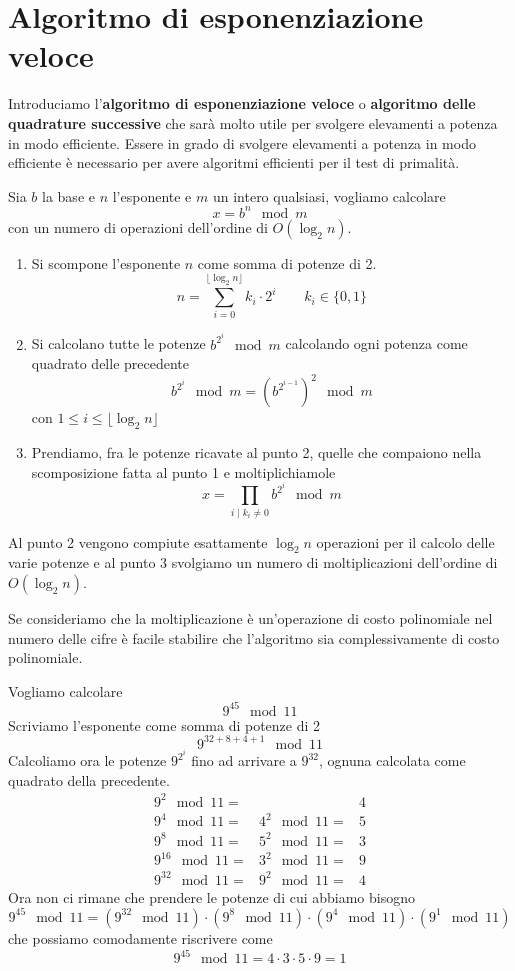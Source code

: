 \section{Algoritmo di esponenziazione veloce}\label{esponenziazione}
Introduciamo l'\textbf{algoritmo di esponenziazione veloce} o \textbf{algoritmo delle quadrature successive} che sar\`a
molto utile per svolgere elevamenti a potenza in modo efficiente. Essere in grado di svolgere elevamenti a potenza
in modo efficiente \`e necessario per avere algoritmi efficienti per il test di primalit\`a.

Sia $b$ la base e $n$ l'esponente e $m$ un intero qualsiasi, vogliamo calcolare
\[ x = b^n \mod{m} \]
con un numero di operazioni dell'ordine di $O(\log_2 n)$.
\begin{enumerate}
	\item Si scompone l'esponente $n$ come somma di potenze di 2.
	      \[ n = \sum_{i=0}^{\lfloor \log_2 n \rfloor} k_i \cdot 2^i \quad \quad k_i \in \{0,1\} \]
	\item Si calcolano tutte le potenze $b^{2^i} \mod{m}$ calcolando ogni potenza come quadrato delle precedente
	      \[ b^{2^i} \mod{m} = \left( b^{2^{i-1}} \right)^2 \mod{m} \]
	      con $1 \leq i \leq \lfloor \log_2 n \rfloor$
	\item Prendiamo, fra le potenze ricavate al punto 2, quelle che compaiono nella scomposizione fatta al
	      punto 1 e moltiplichiamole
	      \[ x = \prod_{i \mid k_i \neq 0} b^{2^i} \mod{m} \]
\end{enumerate}

Al punto 2 vengono compiute esattamente $\log_2 n$ operazioni per il calcolo delle varie potenze e al punto 3 svolgiamo
un numero di moltiplicazioni dell'ordine di $O(\log_2 n)$.

Se consideriamo che la moltiplicazione \`e un'operazione di costo polinomiale nel numero delle cifre \`e facile
stabilire che l'algoritmo sia complessivamente di costo polinomiale.

\begin{example}
	Vogliamo calcolare
	\[ 9^{45} \mod{11} \]
	Scriviamo l'esponente come somma di potenze di 2
	\[ 9^{32 + 8 + 4 + 1} \mod{11} \]
	Calcoliamo ora le potenze $9^{2^i}$ fino ad arrivare a $9^{32}$, ognuna calcolata come quadrato della precedente.
	\[
		\begin{matrix}
			9^2 \mod{11} =    &                & 4 \\
			9^4 \mod{11} =    & 4^2 \mod{11} = & 5 \\
			9^8 \mod{11} =    & 5^2 \mod{11} = & 3 \\
			9^{16} \mod{11} = & 3^2 \mod{11} = & 9 \\
			9^{32} \mod{11} = & 9^2 \mod{11} = & 4
		\end{matrix}
	\]
	Ora non ci rimane che prendere le potenze di cui abbiamo bisogno
	\[ 9^{45} \mod{11} = (9^{32} \mod{11}) \cdot (9^8 \mod{11}) \cdot (9^4 \mod{11}) \cdot (9^1 \mod{11}) \]
	che possiamo comodamente riscrivere come
	\[ 9^{45} \mod{11} = 4 \cdot 3 \cdot 5 \cdot 9 = 1 \]
\end{example}


